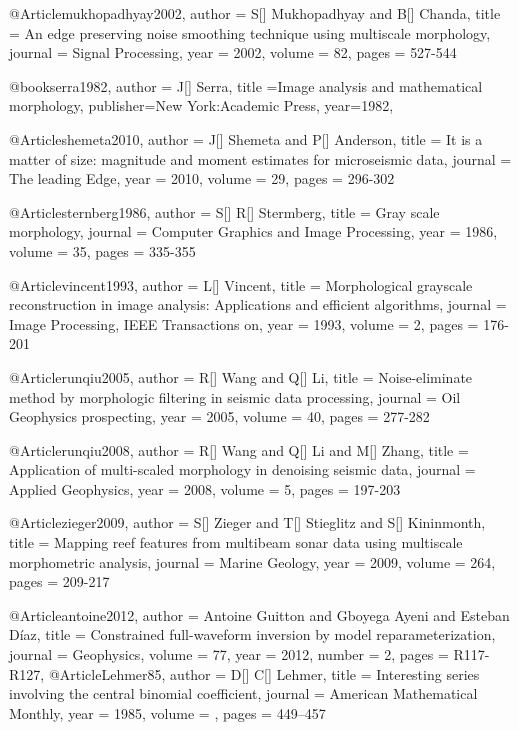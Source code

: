       @Article{mukhopadhyay2002,
  author = 	 {S[] Mukhopadhyay and B[] Chanda},
  title = 	 {An edge preserving noise smoothing technique using
multiscale morphology},
  journal = 	 {Signal Processing},
  year = 	 2002,
  volume = 	 82,
  pages = 	 {527-544}} 
  
  
@book{serra1982,
  author = {J[] Serra},
  title ={Image analysis and mathematical morphology},
  publisher={New York:Academic Press},
  year=1982,
}

       @Article{shemeta2010,
  author = 	 {J[] Shemeta and P[] Anderson},
  title = 	 {It is a matter of size: magnitude and moment estimates for microseismic data},
  journal = 	 {The leading Edge},
  year = 	 2010,
  volume = 	 29,
  pages = 	 {296-302}} 
  
         @Article{sternberg1986,
  author = 	 {S[] R[] Stermberg},
  title = 	 {Gray scale morphology},
  journal = 	 {Computer Graphics and Image Processing},
  year = 	 1986,
  volume = 	 35,
  pages = 	 {335-355}}  
  
          @Article{vincent1993,
  author = 	 {L[] Vincent},
  title = 	 {Morphological grayscale reconstruction in image analysis: Applications and efficient algorithms},
  journal = 	 {Image Processing, IEEE Transactions on},
  year = 	 1993,
  volume = 	 2,
  pages = 	 {176-201}}  
  
          @Article{runqiu2005,
  author = 	 {R[] Wang and Q[] Li},
  title = 	 {Noise-eliminate method by morphologic filtering in seismic data processing},
  journal = 	 {Oil Geophysics prospecting},
  year = 	 2005,
  volume = 	 40,
  pages = 	 {277-282}}  
  
  
            @Article{runqiu2008,
  author = 	 {R[] Wang and Q[] Li and M[] Zhang},
  title = 	 {Application of multi-scaled morphology in denoising seismic data},
  journal = 	 {Applied Geophysics},
  year = 	 2008,
  volume = 	 5,
  pages = 	 {197-203}}    
 
             @Article{zieger2009,
  author = 	 {S[] Zieger and T[] Stieglitz and S[] Kininmonth},
  title = 	 {Mapping reef features from multibeam sonar data using multiscale morphometric analysis},
  journal = 	 {Marine Geology},
  year = 	 2009,
  volume = 	 264,
  pages = 	 {209-217}}   
  
@Article{antoine2012,
  author =	 { Antoine Guitton and Gboyega Ayeni and Esteban Díaz},
  title =	 {Constrained full-waveform inversion by model reparameterization},
  journal =	 {Geophysics},
  volume =	 77,
  year =	 2012,
  number =	 2,
  pages =	 {R117-R127},
}
@Article{Lehmer85,
  author = 	 {D[] C[] Lehmer},
  title = 	 {Interesting series involving the central binomial coefficient},
  journal = 	 {American Mathematical Monthly},
  year = 	 1985,
  volume =	 ,
  pages =	 {449–457}
}

